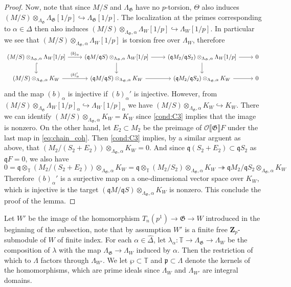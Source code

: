 \documentclass[leqno]{amsart}
\theoremstyle{definition}
\theoremstyle{remark}
\newcommand{\oo}{\mathcal{O}}
\newcommand{\Zp}{\mathbf{Z}_p}
\newcommand{\fp}{\mathfrak{p}}
\newcommand{\fq}{\mathfrak{q}}
\newcommand{\fG}{\mathfrak{G}}
\newcommand{\TT}{\mathbb{T}} %
\begin{document}
\begin{proof}
Now, note that since $M/S$ and $\Lambda_\fG$ have no $p$-torsion,
$\Theta$ also induces
$(M/S)\otimes_{\Lambda_\fG}\Lambda_\fG[1/p]
\hookrightarrow\Lambda_\fG[1/p]$.
The localization at the primes corresponding to 
$\alpha\in\hat{\Delta}$ then also induces
$(M/S)\otimes_{\Lambda_\fG,\alpha}\Lambda_W[1/p]
\hookrightarrow\Lambda_W[1/p]$.
In particular we see that
$(M/S)\otimes_{\Lambda_\fG,\alpha}\Lambda_W[1/p]$
is torsion free over $\Lambda_W$, therefore
\[
\begin{tikzcd}
(M/S)\otimes_{\Lambda_\fG,\alpha}\Lambda_W[1/p]
\arrow[r,"(b)_\alpha"]\arrow[d,hookrightarrow] &
(\fq M/\fq S)\otimes_{\Lambda_\fG,\alpha}\Lambda_W[1/p]
\arrow[r]\arrow[d] &
(\fq M_2/\fq S_2)\otimes_{\Lambda_\fG,\alpha}\Lambda_W[1/p]
\arrow[r]\arrow[d] & 0\\
(M/S)\otimes_{\Lambda_\fG,\alpha}K_W
\arrow[r,"(b)_\alpha'"] &
(\fq M/\fq S)\otimes_{\Lambda_\fG,\alpha}K_W
\arrow[r] &
(\fq M_2/\fq S_2)\otimes_{\Lambda_\fG,\alpha}K_W
\arrow[r] & 0
\end{tikzcd}
\]
and the map $(b)_\alpha$ is injective if
$(b)_\alpha'$ is injective.
However, from
$(M/S)\otimes_{\Lambda_\fG}\Lambda_W[1/p]_\alpha
\hookrightarrow\Lambda_W[1/p]_\alpha$
we have
$(M/S)\otimes_{\Lambda_\fG,\alpha}K_W
\hookrightarrow K_W$.
There we can identify
$(M/S)\otimes_{\Lambda_\fG,\alpha}K_W=K_W$
since \ref{cond:C3}
implies that the image is nonzero.
On the other hand,
let $E_2\subset M_2$
be the preimage of
$\oo\llbracket\fG\rrbracket F$
under the last map in \eqref{eq:chain_coh}.
Then \ref{cond:C3} implies, by a similar arguent as above, that
$(M_2/(S_2+E_2))\otimes_{\Lambda_\fG,\alpha}K_W=0$.
And since $\fq(S_2+E_2)\subset \fq S_2$
as $\fq F=0$, we also have
\[
    0=\fq\otimes_{\TT}\left(M_2/(S_2+E_2)\right)
    \otimes_{\Lambda_\fG,\alpha}K_W
    =\fq\otimes_{\TT}(M_2/S_2)
    \otimes_{\Lambda_\fG,\alpha}K_W
    \twoheadrightarrow
    \fq M_2/\fq S_2\otimes_{\Lambda_\fG,\alpha}K_W
\]
Therefore $(b)_\alpha'$ is a surjective map
on a one-dimensional vector space over $K_W$,
which is injective is the target
$(\fq M/\fq S)\otimes_{\Lambda_\fG,\alpha}K_W$
is nonzero.
This conclude the proof of the lemma.
\end{proof}

Let $W'$
be the image of the 
homomorphism
$T_n(p^1)\to \fG\to W$
introduced in the beginning of the subsection,
note that by assumption
$W'$ is a finite free $\Zp$-submodule
of $W$ of finite index.
For each $\alpha\in \hat{\Delta}$,
let $\lambda_\alpha\colon \TT\to \Lambda_\fG\to \Lambda_W$
be the composition of $\lambda$ with
the map  $\Lambda_\fG\to \Lambda_W$
induced by $\alpha$.
Then the restriction of which to 
$\Lambda$ factors through $\Lambda_{W'}$.
We let $\wp\subset \TT$
and $\fp\subset \Lambda$
denote the kernels of the homomorphisms,
which are prime ideals
since $\Lambda_W$ and $\Lambda_{W'}$
are integral domains.
\end{document}
